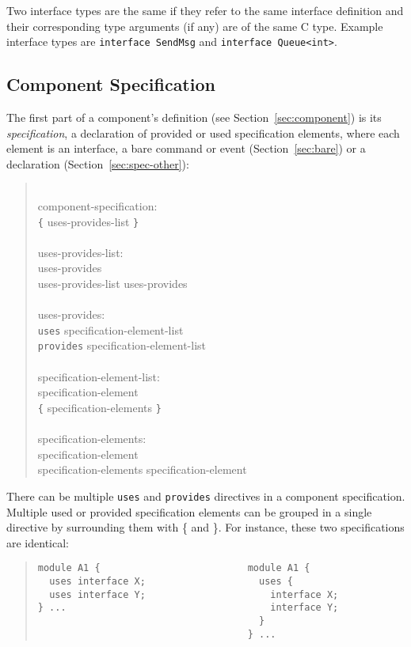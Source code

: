 \documentclass[11pt,letterpaper]{article}
\newcommand{\kw}[1]{{\tt #1}}
\newcommand{\grammarshift}{\vspace*{-.7cm}}
\newcommand{\grammarindent}{\hspace*{2cm}\= \\ \kill}
\begin{document}
Two interface types are the same if they refer to the same interface
definition and their corresponding type arguments (if any) are of the same
C type. Example interface types are \kw{interface SendMsg} and
\kw{interface Queue<int>}.

\subsection{Component Specification}
\label{sec:component-spec}

The first part of a component's definition (see Section~\ref{sec:component})
is its \emph{specification}, a declaration of provided or used
specification elements, where each element is an interface, 
a bare command or event (Section~\ref{sec:bare}) or a declaration
(Section~\ref{sec:spec-other}):
\begin{quote} \grammarshift \em \begin{tabbing}
\grammarindent
component-specification:\\
\>	\kw{\{} uses-provides-list \kw{\}}\\
\\
uses-provides-list:\\
\>	uses-provides\\
\>	uses-provides-list uses-provides\\
\\
uses-provides:\\
\>	\kw{uses} specification-element-list\\
\>	\kw{provides} specification-element-list\\
\\
specification-element-list:\\
\>	specification-element\\
\>	\kw{\{} specification-elements \kw{\}}\\
\\
specification-elements:\\
\>	specification-element\\
\>	specification-elements specification-element\\
\end{tabbing} \end{quote}
There can be multiple \kw{uses} and \kw{provides} directives in a component
specification. Multiple used or provided specification elements can be
grouped in a single directive by surrounding them with \{ and \}. For
instance, these two specifications are identical:

\begin{quote} \begin{verbatim}
module A1 {                          module A1 {      
  uses interface X;                    uses {         
  uses interface Y;                      interface X; 
} ...                                    interface Y; 
                                       }              
                                     } ...            
\end{verbatim} \end{quote}
\end{document}
